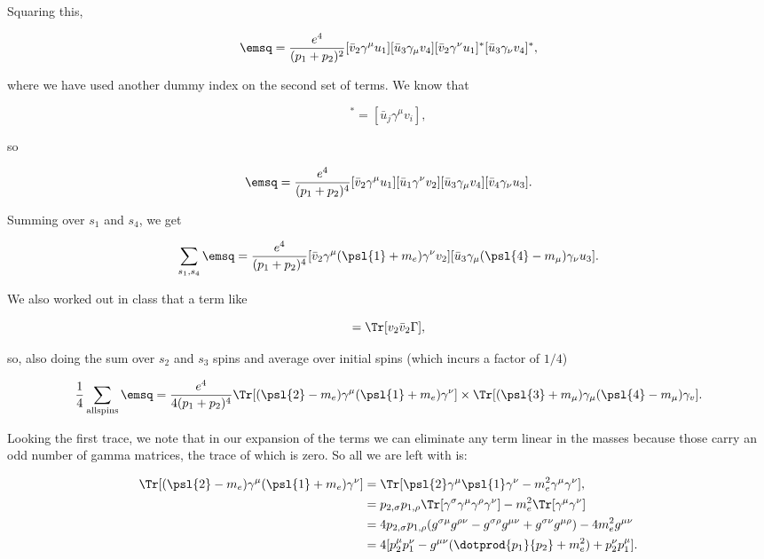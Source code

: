 Squaring this, 

\begin{equation*}
    \emsq = \frac{e^4}{(p_1+p_2)^2} [\bar{v}_2 \gamma^{\mu} u_1][\bar{u}_3 \gamma_{\mu} v_4] [\bar{v}_2 \gamma^{\nu} u_1]^*[\bar{u}_3 \gamma_{\nu} v_4]^*,
\end{equation*}

where we have used another dummy index on the second set of terms. We know that

\begin{equation*}
    [\bar{v}_i \gamma^{\mu} u_j]^* = [\bar{u}_j \gamma^{\mu} v_i],
\end{equation*}

so

\begin{equation*}
    \emsq = \frac{e^4}{(p_1+p_2)^4} [\bar{v}_2 \gamma^{\mu} u_1][\bar{u}_1 \gamma^{\nu} v_2] [\bar{u}_3 \gamma_{\mu} v_4][\bar{v}_4 \gamma_{\nu} u_3].
\end{equation*}

Summing over $s_1$ and $s_4$, we get

\begin{equation*}
    \sum_{s_1,s_4}\emsq = \frac{e^4}{(p_1+p_2)^4} [\bar{v}_2 \gamma^{\mu} (\psl{1} + m_e) \gamma^{\nu} v_2][\bar{u}_3 \gamma_{\mu} (\psl{4} - m_{\mu}) \gamma_{\nu} u_3].
\end{equation*}

We also worked out in class that a term like

\begin{equation*}
    [\bar{v}_2 \Gamma v_2] = \Tr[v_2\bar{v}_2 \Gamma],
\end{equation*}

so, also doing the sum over $s_2$ and $s_3$ spins and average over initial spins (which incurs a factor of $1/4$)

\begin{equation*}
    \frac{1}{4}\sum_{\mathrm{all spins}}\emsq = \frac{e^4}{4(p_1+p_2)^4}\Tr[(\psl{2} - m_e)\gamma^{\mu}(\psl{1} + m_e)\gamma^{\nu}] \times \Tr[(\psl{3} + m_{\mu})\gamma_{\mu}(\psl{4} - m_{\mu})\gamma_v].
\end{equation*}

Looking the first trace, we note that in our expansion of the terms we can eliminate any term linear in the masses because those carry an odd number of gamma matrices, the trace of which is zero. So all we are left with is:

\begin{align*}
    \Tr[(\psl{2} - m_e)\gamma^{\mu}(\psl{1} + m_e)\gamma^{\nu}] &= \Tr[\psl{2}\gamma^{\mu}\psl{1}\gamma^{\nu} - m_e^2\gamma^{\mu}\gamma^{\nu}], \\
    &= p_{2,\sigma}p_{1,\rho}\Tr[\gamma^{\sigma}\gamma^{\mu}\gamma^{\rho}\gamma^{\nu}] - m_e^2\Tr[\gamma^{\mu}\gamma^{\nu}] \\
    &= 4p_{2,\sigma}p_{1,\rho} (g^{\sigma\mu}g^{\rho\nu} - g^{\sigma\rho}g^{\mu\nu} + g^{\sigma\nu}g^{\mu\rho}) - 4m_e^2g^{\mu\nu} \\
    &= 4[p_2^{\mu}p_1^{\nu} - g^{\mu\nu}(\dotprod{p_1}{p_2} + m_e^2) + p_2^{\nu}p_1^{\mu}].
\end{align*}

